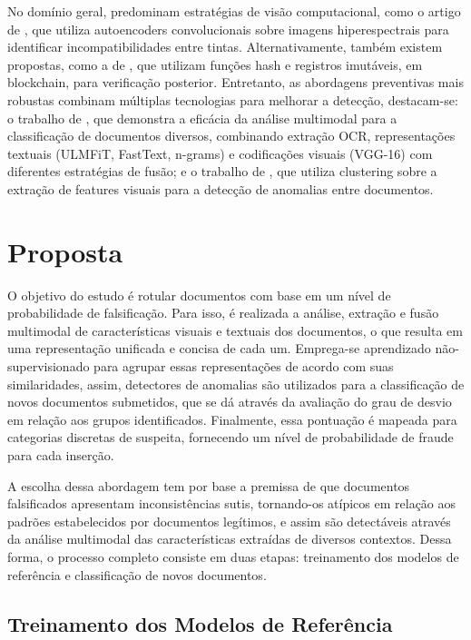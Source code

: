 \documentclass[12pt]{article}
\begin{document}
No domínio geral, predominam estratégias de visão computacional, como o artigo de \cite{inkcnn}, que utiliza autoencoders convolucionais sobre imagens hiperespectrais para identificar incompatibilidades entre tintas. Alternativamente, também existem propostas, como a de \cite{hashdetection}, que utilizam funções hash e registros imutáveis, em blockchain, para verificação posterior. Entretanto, as abordagens preventivas mais robustas combinam múltiplas tecnologias para melhorar a detecção, destacam-se: o trabalho de \cite{multimodal}, que demonstra a eficácia da análise multimodal para a classificação de documentos diversos, combinando extração OCR, representações textuais (ULMFiT, FastText, n-grams) e codificações visuais (VGG-16) com diferentes estratégias de fusão; e o trabalho de \cite{clusterfraudverification}, que utiliza clustering sobre a extração de features visuais para a detecção de anomalias entre documentos.

\section{Proposta}

O objetivo do estudo é rotular documentos com base em um nível de probabilidade de falsificação. Para isso, é realizada a análise, extração e fusão multimodal de características visuais e textuais dos documentos, o que resulta em uma representação unificada e concisa de cada um. Emprega-se aprendizado não-supervisionado para agrupar essas representações de acordo com suas similaridades, assim, detectores de anomalias são utilizados para a classificação de novos documentos submetidos, que se dá através da avaliação do grau de desvio em relação aos grupos identificados. Finalmente, essa pontuação é mapeada para categorias discretas de suspeita, fornecendo um nível de probabilidade de fraude para cada inserção.

A escolha dessa abordagem tem por base a premissa de que documentos falsificados apresentam inconsistências sutis, tornando-os atípicos em relação aos padrões estabelecidos por documentos legítimos, e assim são detectáveis através da análise multimodal das características extraídas de diversos contextos. Dessa forma, o processo completo consiste em duas etapas: treinamento dos modelos de referência e classificação de novos documentos.

\subsection{Treinamento dos Modelos de Referência}
\end{document}
